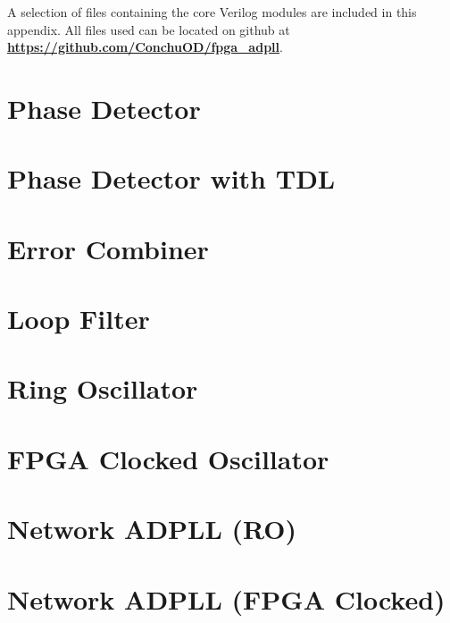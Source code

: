 A selection of files containing the core Verilog modules are included in this appendix. All files used can be located on github at  \href{https://github.com/ConchuOD/fpga_adpll}{\textbf{https://github.com/ConchuOD/fpga\_adpll}}.
\section{Phase Detector}\label{lst:PhaseDetector}



\section{Phase Detector with \acs{TDL}}\label{lst:phase_detector_dl}


\section{Error Combiner}\label{lst:error_combiner}


\section{Loop Filter}\label{lst:loop_filter}


\section{Ring Oscillator}\label{lst:ring_osc}


\section{\acs{FPGA} Clocked Oscillator}\label{lst:phase_accum}


\section{Network \acs{ADPLL} (\acs{RO})}\label{lst:network_ring_adpll}


\section{Network \acs{ADPLL} (\ac{FPGA} Clocked)}\label{lst:network_adpll}



